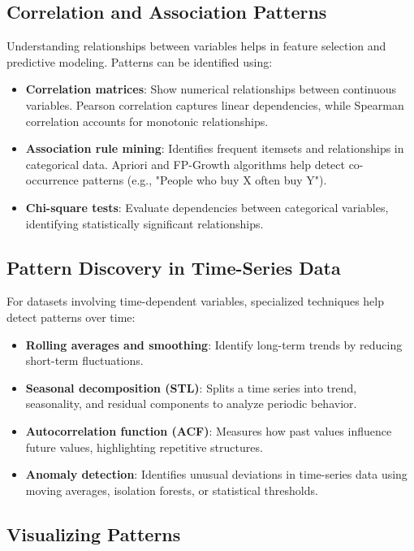 \documentclass[12pt,openany]{book}
\begin{document}
\subsection{Correlation and Association Patterns}

Understanding relationships between variables helps in feature selection and predictive modeling. Patterns can be identified using:
\begin{itemize}
    \item \textbf{Correlation matrices}: Show numerical relationships between continuous variables. Pearson correlation captures linear dependencies, while Spearman correlation accounts for monotonic relationships.
    \item \textbf{Association rule mining}: Identifies frequent itemsets and relationships in categorical data. Apriori and FP-Growth algorithms help detect co-occurrence patterns (e.g., "People who buy X often buy Y").
    \item \textbf{Chi-square tests}: Evaluate dependencies between categorical variables, identifying statistically significant relationships.
\end{itemize}

\subsection{Pattern Discovery in Time-Series Data}

For datasets involving time-dependent variables, specialized techniques help detect patterns over time:
\begin{itemize}
    \item \textbf{Rolling averages and smoothing}: Identify long-term trends by reducing short-term fluctuations.
    \item \textbf{Seasonal decomposition (STL)}: Splits a time series into trend, seasonality, and residual components to analyze periodic behavior.
    \item \textbf{Autocorrelation function (ACF)}: Measures how past values influence future values, highlighting repetitive structures.
    \item \textbf{Anomaly detection}: Identifies unusual deviations in time-series data using moving averages, isolation forests, or statistical thresholds.
\end{itemize}

\subsection{Visualizing Patterns}
\end{document}
